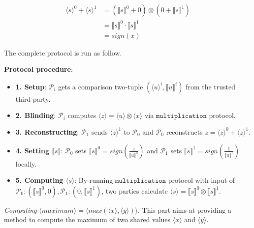\documentclass[letterpaper]{article} %
\begin{document}
    \begin{align*}
        \langle s\rangle^{0} +\langle s\rangle^{1}&=(\llbracket s \rrbracket ^{0}+0)\otimes (0+\llbracket s \rrbracket ^{1})\\
        &=\llbracket s \rrbracket ^{0}\cdot \llbracket s \rrbracket ^{1}\\
        &=sign(x)
    \end{align*}




       The complete protocol is run as follow.

       \textbf{Protocol procedure}:
       \begin{itemize}
           \item \textbf{1. Setup}: $\mathcal{P}_{i}$ gets a comparison two-tuple $(\langle u\rangle ^{i},\llbracket u \rrbracket ^{i})$ from the trusted third party.

           \item \textbf{2. Blinding}:
           $\mathcal{P}_{i}$ computes $\langle z\rangle = \langle u\rangle \otimes \langle x\rangle $ via $\mathtt{multiplication}$ protocol.


           \item \textbf{3. Reconstructing}:
           $\mathcal{P}_{1}$ sends $\langle z\rangle ^{1}$ to $\mathcal{P}_{0}$ and
           $\mathcal{P}_{0}$ reconstructs
           $z = \langle z\rangle ^{0}+\langle z\rangle ^{1}$.



           \item \textbf{4. Setting $\llbracket s \rrbracket$}:
           $\mathcal{P}_{0}$ sets $\llbracket s \rrbracket^{0}
           =sign(\frac{z}{\llbracket u \rrbracket^{0}})$
           and $\mathcal{P}_{1}$ sets $\llbracket s \rrbracket^{1}
           =sign(\frac{1}{\llbracket u \rrbracket^{1}})$ locally.

           \item \textbf{5. Computing $\langle s\rangle$}:
           By running $\mathtt{multiplication}$ protocol with input of
           $\mathcal{P}_{0}:(\llbracket s \rrbracket ^{0},0),\mathcal{P}_{1}:(0,\llbracket s \rrbracket ^{1})$,
           two parties calculate  $\langle s\rangle = \llbracket s \rrbracket ^{0}\otimes \llbracket s \rrbracket ^{1}$.

       \end{itemize}



       \emph{Computing} $ \langle maximum\rangle  = \langle max(\langle x\rangle,\langle y\rangle)\rangle $.
       This part aims at providing a method to compute the maximum of two shared values $\langle x \rangle$ and $\langle y \rangle$.
\end{document}
